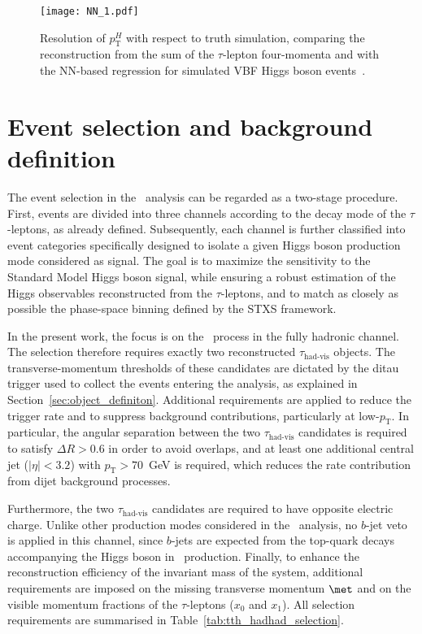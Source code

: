 \begin{figure}[htbp]
    \centering
    \texttt{[image: NN\_1.pdf]}
    \caption{Resolution of $p_{\text{T}}^{H}$ with respect to truth simulation, comparing the reconstruction from the sum of the $\tau$-lepton four-momenta and \etmiss with the NN-based regression for simulated VBF Higgs boson events~\cite{differential_htautau}.}
    \label{fig:ptH_resolution}
\end{figure}

\section{Event selection and background definition}
\label{sec:event_selection_background}

The event selection in the \htautau\ analysis can be regarded as a two-stage procedure. 
First, events are divided into three channels according to the decay mode of the $\tau$-leptons, as already defined. 
Subsequently, each channel is further classified into event categories specifically designed to isolate a given Higgs boson production mode considered as signal. 
The goal is to maximize the sensitivity to the Standard Model Higgs boson signal, while ensuring a robust estimation of the Higgs observables reconstructed from the $\tau$-leptons, and to match as closely as possible the phase-space binning defined by the STXS framework.

In the present work, the focus is on the \ttHtt\ process in the fully hadronic channel. 
The selection therefore requires exactly two reconstructed $\tau_{\text{had-vis}}$ objects. 
The transverse-momentum thresholds of these candidates are dictated by the ditau trigger used to collect the events entering the analysis, as explained in Section~\ref{sec:object_definiton}. 
Additional requirements are applied to reduce the trigger rate and to suppress background contributions, particularly at low-$p_{\text{T}}$. 
In particular, the angular separation between the two $\tau_{\text{had-vis}}$ candidates is required to satisfy $\Delta R > 0.6$ in order to avoid overlaps, and at least one additional central jet ($|\eta| < 3.2$) with $p_{\text{T}} > 70$~GeV is required, which reduces the rate contribution from dijet background processes.

Furthermore, the two $\tau_{\text{had-vis}}$ candidates are required to have opposite electric charge. 
Unlike other production modes considered in the \htautau\ analysis, no $b$-jet veto is applied in this channel, since $b$-jets are expected from the top-quark decays accompanying the Higgs boson in \ttH\ production. 
Finally, to enhance the reconstruction efficiency of the invariant mass of the system, additional requirements are imposed on the missing transverse momentum $\met$ and on the visible momentum fractions of the $\tau$-leptons ($x_0$ and $x_1$). 
All selection requirements are summarised in Table~\ref{tab:tth_hadhad_selection}.

